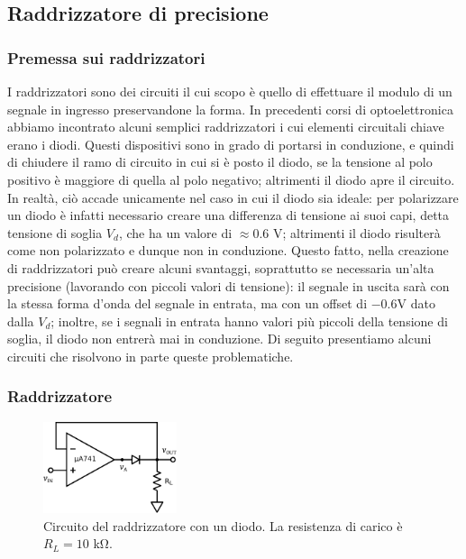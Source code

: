 \subsection{Raddrizzatore di precisione}

\subsubsection{Premessa sui raddrizzatori}

I raddrizzatori sono dei circuiti il cui scopo è quello di effettuare il modulo di un segnale in ingresso preservandone la forma. In precedenti corsi di optoelettronica abbiamo incontrato alcuni semplici raddrizzatori i cui elementi circuitali chiave erano i diodi. Questi dispositivi sono in grado di portarsi in conduzione, e quindi di chiudere il ramo di circuito in cui si è posto il diodo, se la tensione al polo positivo è maggiore di quella al polo negativo; altrimenti il diodo apre il circuito. In realtà, ciò accade unicamente nel caso in cui il diodo sia ideale: per polarizzare un diodo è infatti necessario creare una differenza di tensione ai suoi capi, detta tensione di soglia $V_d$, che ha un valore di $\approx 0.6$ \si{\volt}; altrimenti il diodo risulterà come non polarizzato e dunque non in conduzione. Questo fatto, nella creazione di raddrizzatori può creare alcuni svantaggi, soprattutto se necessaria un'alta precisione (lavorando con piccoli valori di tensione): il segnale in uscita sarà con la stessa forma d'onda del segnale in entrata, ma con un offset di $-0.6$\si{\volt} dato dalla $V_d$; inoltre, se i segnali in entrata hanno valori più piccoli della tensione di soglia, il diodo non entrerà mai in conduzione. Di seguito presentiamo alcuni circuiti che risolvono in parte queste problematiche.

\subsubsection{Raddrizzatore}

\begin{figure}
  \begin{center}
    \includegraphics[width=0.350\textwidth]{../E05/latex/c_rectifier_A.pdf}
  \end{center}
  \caption{Circuito del raddrizzatore con un diodo. La resistenza di carico è $R_L=10$ \si{\kilo\ohm}.}
  \label{cir5:raddrizz_1}
\end{figure}

